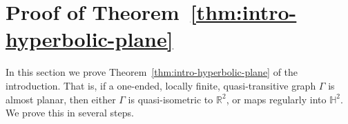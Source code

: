 \documentclass[11pt,a4paper]{amsart}
\newcommand{\R}{\mathbb{R}}
\newcommand{\bbH}{\mathbb{H}}
\theoremstyle{definition}
\begin{document}
    






\section{Proof of Theorem~\ref{thm:intro-hyperbolic-plane}}



In this section we prove Theorem~\ref{thm:intro-hyperbolic-plane} of the introduction. That is, if a one-ended, locally finite, quasi-transitive graph $\Gamma$ is almost planar, then either $\Gamma$ is quasi-isometric to $\R^2$, or maps regularly into $\bbH^2$. We prove this in several steps. 
\end{document}
